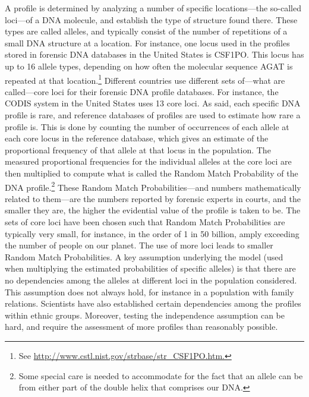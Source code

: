 \documentclass[10pt]{article}
\begin{document}
A profile is determined by analyzing a number of specific locations---the so-called loci---of a DNA molecule, and establish the type of structure found there. These types are called alleles, and typically consist of the number of repetitions of a small DNA structure at a location. For instance, one locus used in the profiles stored in forensic DNA databases in the United States is CSF1PO.
This locus has up to 16 allele types, 
depending on how often the molecular sequence AGAT is repeated at that location.\footnote{See \url{http://www.cstl.nist.gov/strbase/str\_CSF1PO.htm.}} 
Different countries use different sets of---what are called---core loci for their forensic DNA profile databases. 
For instance, the CODIS system in the United States uses 13 core loci. As said, each specific DNA profile is rare, and reference databases of profiles 
are used to estimate 
how rare a profile 
is.
This is done by counting the number of occurrences of each allele at each core locus in the reference database, which gives an estimate of the proportional frequency of that allele at that locus in the population. The measured proportional frequencies for the individual alleles at the core loci are then multiplied to compute what is called the Random Match Probability of the DNA profile.\footnote{Some special care is needed to accommodate for the fact that an allele can be from either part of the double helix that comprises our DNA.} These Random Match Probabilities---and numbers mathematically related to them---are the numbers reported by forensic experts in courts, and the smaller they are, the higher the evidential value of the profile is taken to be. The sets of core loci have been chosen such that Random Match Probabilities are typically very small, for instance, in the order of 1 in 50 billion, amply exceeding the number of people on our planet. The use of more loci leads to smaller Random Match Probabilities. A key assumption underlying the model (used when multiplying the estimated probabilities of specific alleles) is that there are no dependencies among the alleles at different loci in the population considered. This assumption does not always hold, for instance in a population with family relations. Scientists have also established certain dependencies among the profiles within ethnic groups. Moreover, testing the independence assumption can be hard, and require the assessment of more profiles than reasonably possible. 
\end{document}
